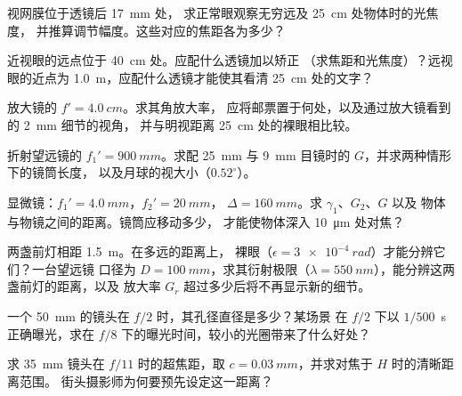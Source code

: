 \begin{exercise}[$\star$]\label{exo:b1:optical-instruments:1}
视网膜位于透镜后 \qty{17}{mm} 处，
求正常眼观察无穷远及 \qty{25}{cm} 处物体时的光焦度，
并推算调节幅度。这些对应的焦距各为多少？
\end{exercise}

\begin{exercise}[$\star$]\label{exo:b1:optical-instruments:2}
近视眼的远点位于 \qty{40}{cm} 处。应配什么透镜加以矫正
（求焦距和光焦度）？远视眼的近点为
\qty{1.0}{m}，应配什么透镜才能使其看清 \qty{25}{cm} 处的文字？
\end{exercise}

\begin{exercise}[$\star$]\label{exo:b1:optical-instruments:3}
放大镜的 $f' = \qty{4.0}{cm}$。求其角放大率，
应将邮票置于何处，以及通过放大镜看到的 \qty{2}{mm} 细节的视角，
并与明视距离 \qty{25}{cm} 处的裸眼相比较。
\end{exercise}

\begin{exercise}[$\star$]\label{exo:b1:optical-instruments:4}
折射望远镜的 $f_1' = \qty{900}{mm}$。求配 \qty{25}{mm}
与 \qty{9}{mm} 目镜时的 $G$，并求两种情形下的镜筒长度，
以及月球的视大小（$0.52^\circ$）。
\end{exercise}

\begin{exercise}[$\star\star$]\label{exo:b1:optical-instruments:5}
显微镜：$f_1' = \qty{4.0}{mm}$，$f_2' = \qty{20}{mm}$，
$\Delta = \qty{160}{mm}$。求 $\gamma_1$、$G_2$、$G$ 以及
物体与物镜之间的距离。镜筒应移动多少，
才能使物体深入 \qty{10}{\micro m} 处对焦？
\end{exercise}

\begin{exercise}[$\star\star$]\label{exo:b1:optical-instruments:6}
两盏前灯相距 \qty{1.5}{m}。在多远的距离上，
裸眼（$\epsilon = \qty{3e-4}{rad}$）才能分辨它们？一台望远镜
口径为 $D = \qty{100}{mm}$，求其衍射极限（$\lambda =
\qty{550}{nm}$），能分辨这两盏前灯的距离，以及
放大率 $G_r$ 超过多少后将不再显示新的细节。
\end{exercise}

\begin{exercise}[$\star\star$]\label{exo:b1:optical-instruments:7}
一个 \qty{50}{mm} 的镜头在 $f/2$ 时，其孔径直径是多少？某场景
在 $f/2$ 下以 $1/500$~\unit{s} 正确曝光，求在
$f/8$ 下的曝光时间，较小的光圈带来了什么好处？
\end{exercise}

\begin{exercise}[$\star\star$]\label{exo:b1:optical-instruments:8}
求 \qty{35}{mm} 镜头在 $f/11$ 时的超焦距，取
$c = \qty{0.03}{mm}$，并求对焦于 $H$ 时的清晰距离范围。
街头摄影师为何要预先设定这一距离？
\end{exercise}

